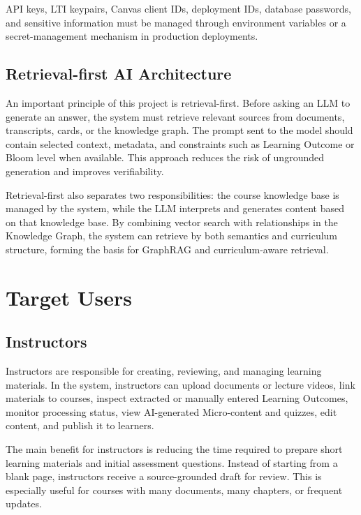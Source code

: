 API keys, LTI keypairs, Canvas client IDs, deployment IDs, database passwords,
and sensitive information must be managed through environment variables or a
secret-management mechanism in production deployments.

\subsection{Retrieval-first AI Architecture}

An important principle of this project is retrieval-first. Before asking an LLM
to generate an answer, the system must retrieve relevant sources from
documents, transcripts, cards, or the knowledge graph. The prompt sent to the
model should contain selected context, metadata, and constraints such as
Learning Outcome or Bloom level when available. This approach reduces the risk
of ungrounded generation and improves verifiability.

Retrieval-first also separates two responsibilities: the course knowledge base
is managed by the system, while the LLM interprets and generates content based
on that knowledge base. By combining vector search with relationships in the
Knowledge Graph, the system can retrieve by both semantics and curriculum
structure, forming the basis for GraphRAG and curriculum-aware retrieval.

\section{Target Users}

\subsection{Instructors}

Instructors are responsible for creating, reviewing, and managing learning
materials. In the system, instructors can upload documents or lecture videos,
link materials to courses, inspect extracted or manually entered Learning
Outcomes, monitor processing status, view AI-generated Micro-content and
quizzes, edit content, and publish it to learners.

The main benefit for instructors is reducing the time required to prepare short
learning materials and initial assessment questions. Instead of starting from a
blank page, instructors receive a source-grounded draft for review. This is
especially useful for courses with many documents, many chapters, or frequent
updates.

